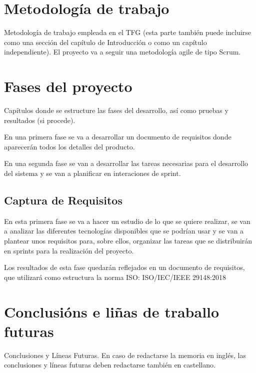 \documentclass[12pt, a4paper, twoside]{article}
\begin{document}
\section{Metodología de trabajo}
Metodología de trabajo empleada en el TFG (esta parte también puede incluirse como una sección del capítulo de Introducción o como un capítulo independiente).
El proyecto va a seguir una metodología agile de tipo Scrum.


\section{Fases del proyecto}
Capítulos donde se estructure las fases del desarrollo, así como pruebas y resultados (si procede). 

En una primera fase se va a desarrollar un documento de requisitos donde aparecerán todos los detalles del producto.

En una segunda fase se van a desarrollar las tareas necesarias para el desarrollo del sistema y se van
a planificar en interaciones de sprint. 

\subsection{Captura de Requisitos}
En esta primera fase se va a hacer un estudio de lo que se quiere realizar, 
se van a analizar las diferentes tecnologías disponibles que se podrían usar y 
se van a plantear unos requisitos para, sobre ellos, organizar las tareas que 
se distribuirán en sprints para la realización del proyecto.

Los resultados de esta fase quedarán reflejados en un documento de requisitos, que 
utilizará como estructura la norma ISO: ISO/IEC/IEEE 29148:2018

\section{Conclusións e liñas de traballo futuras}
Conclusiones y Líneas Futuras. En caso de redactarse la memoria en inglés, las conclusiones y líneas futuras deben redactarse también en castellano.
\end{document}
